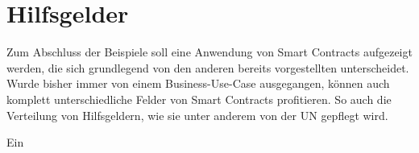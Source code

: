 \chapter{Hilfsgelder}
\label{chap:Hilfsgelder}
Zum Abschluss der Beispiele soll eine Anwendung von Smart Contracts aufgezeigt werden, die sich grundlegend von den anderen bereits vorgestellten unterscheidet. Wurde bisher immer von einem Business-Use-Case ausgegangen, können auch komplett unterschiedliche Felder von Smart Contracts profitieren. So auch die Verteilung von Hilfsgeldern, wie sie unter anderem von der UN gepflegt wird. 

Ein 